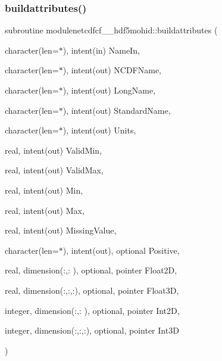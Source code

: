 \subsubsection{\texorpdfstring{buildattributes()}{buildattributes()}}
{\footnotesize\ttfamily subroutine modulenetcdfcf\+\_\+\_\+hdf5mohid\+::buildattributes (\begin{DoxyParamCaption}\item[{character(len=$\ast$), intent(in)}]{Name\+In,  }\item[{character(len=$\ast$), intent(out)}]{N\+C\+D\+F\+Name,  }\item[{character(len=$\ast$), intent(out)}]{Long\+Name,  }\item[{character(len=$\ast$), intent(out)}]{Standard\+Name,  }\item[{character(len=$\ast$), intent(out)}]{Units,  }\item[{real, intent(out)}]{Valid\+Min,  }\item[{real, intent(out)}]{Valid\+Max,  }\item[{real, intent(out)}]{Min,  }\item[{real, intent(out)}]{Max,  }\item[{real, intent(out)}]{Missing\+Value,  }\item[{character(len=$\ast$), intent(out), optional}]{Positive,  }\item[{real, dimension(\+:,\+:  ), optional, pointer}]{Float2D,  }\item[{real, dimension(\+:,\+:,\+:), optional, pointer}]{Float3D,  }\item[{integer, dimension(\+:,\+:  ), optional, pointer}]{Int2D,  }\item[{integer, dimension(\+:,\+:,\+:), optional, pointer}]{Int3D }\end{DoxyParamCaption})\hspace{0.3cm}{\ttfamily [private]}}

